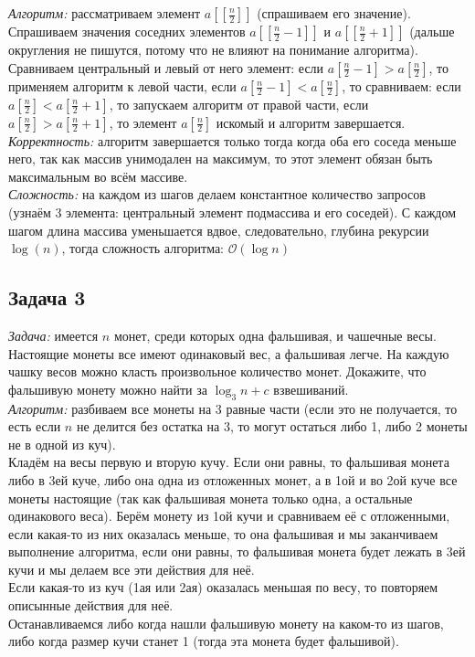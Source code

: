 \documentclass[a4paper,12pt]{article} %
\begin{document}
\textit{Алгоритм:} рассматриваем элемент $ a \left[\left[\frac{n}{2}\right]\right] $ (спрашиваем его значение). Спрашиваем значения соседних элементов $ a \left[\left[\frac{n}{2} - 1\right]\right] $ и $ a \left[\left[\frac{n}{2} + 1\right]\right] $ (дальше округления не пишутся, потому что не влияют на понимание алгоритма). Сравниваем центральный и левый от него элемент: если $ a \left[\frac{n}{2} - 1\right] > a \left[\frac{n}{2}\right] $, то применяем алгоритм к левой части, если $ a \left[\frac{n}{2} - 1\right] < a \left[\frac{n}{2}\right] $, то сравниваем: если $ a \left[\frac{n}{2} \right] < a \left[\frac{n}{2} + 1\right] $, то запускаем алгоритм от правой части, если $ a \left[\frac{n}{2}\right] > a \left[\frac{n}{2} + 1\right] $, то элемент $ a \left[\frac{n}{2}\right] $ искомый и алгоритм завершается.\\

\textit{Корректность:} алгоритм завершается только тогда  когда оба его соседа меньше него, так как массив унимодален на максимум, то этот элемент обязан быть максимальным во всём массиве.\\

\textit{Сложность:} на каждом из шагов делаем константное количество запросов (узнаём 3 элемента: центральный элемент подмассива и его соседей). С каждом шагом длина массива уменьшается вдвое, следовательно, глубина рекурсии $ \log(n) $, тогда сложность алгоритма:  $ \mathcal{O}(\log n) $
  
\subsection*{Задача 3}
\textit{Задача:} имеется $n$ монет, среди которых одна фальшивая, и чашечные весы.
Настоящие монеты все имеют одинаковый вес, а фальшивая легче. На каждую чашку весов можно класть произвольное количество монет.
Докажите, что фальшивую монету можно найти за $\log_3 n+c$ взвешиваний.\\

\textit{Алгоритм:} разбиваем все монеты на 3 равные части (если это не получается, то есть если $ n $ не делится без остатка на 3, то могут остаться либо 1, либо 2 монеты не в одной из куч). \\
Кладём на весы первую и вторую кучу. Если они равны, то фальшивая монета либо в 3ей куче, либо она одна из отложенных монет, а в 1ой и во 2ой куче все монеты настоящие (так как фальшивая монета только одна, а остальные одинакового веса). Берём монету из 1ой кучи и сравниваем её с отложенными, если какая-то из них оказалась меньше, то она фальшивая и мы заканчиваем выполнение алгоритма, если они равны, то фальшивая монета будет лежать в 3ей кучи и мы делаем все эти действия для неё.\\
Если какая-то из куч (1ая или 2ая) оказалась меньшая по весу, то повторяем описынные действия для неё.\\
Останавливаемся либо когда нашли фальшивую монету на каком-то из шагов, либо когда размер кучи станет 1 (тогда эта монета будет фальшивой).\\
\end{document}
